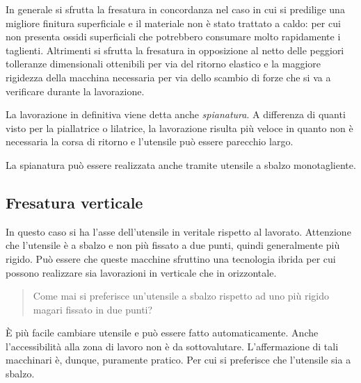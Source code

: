 In generale si sfrutta la fresatura in concordanza nel caso in cui si predilige una migliore finitura 
superficiale e il materiale non è stato trattato a caldo: per cui non presenta ossidi superficiali che 
potrebbero consumare molto rapidamente i taglienti.
Altrimenti si sfrutta la fresatura in opposizione al netto delle peggiori tolleranze dimensionali ottenibili 
per via del ritorno elastico e la maggiore rigidezza della macchina necessaria per via dello scambio di 
forze che si va a verificare durante la lavorazione.

La lavorazione in definitiva viene detta anche \emph{spianatura}. 
A differenza di quanti visto per la piallatrice o lilatrice, la lavorazione risulta più veloce in quanto
non è necessaria la corsa di ritorno e l'utensile può essere parecchio largo.

La spianatura può essere realizzata anche tramite utensile a sbalzo monotagliente.

\subsection{Fresatura verticale}
In questo caso si ha l'asse dell'utensile in veritale rispetto al lavorato. 
Attenzione che l'utensile è a sbalzo e non più fissato a due punti, quindi generalmente più rigido.
Può essere che queste macchine sfruttino una tecnologia ibrida per cui possono realizzare sia lavorazioni
in verticale che in orizzontale.

\begin{quote}
Come mai si preferisce un'utensile a sbalzo rispetto ad uno più rigido magari fissato in due punti?
\end{quote}

È più facile cambiare utensile e può essere fatto automaticamente. Anche l'accessibilità alla zona di lavoro
non è da sottovalutare.
L'affermazione di tali macchinari è, dunque, puramente pratico.
Per cui si preferisce che l'utensile sia a sbalzo.

